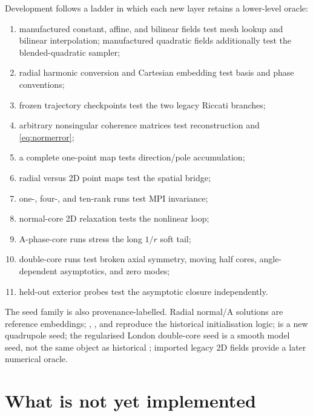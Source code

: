 \documentclass[11pt,a4paper]{article}
\newcommand{\code}[1]{\texttt{\detokenize{#1}}}
\begin{document}
Development follows a ladder in which each new layer retains a lower-level
oracle:
\begin{enumerate}
  \item manufactured constant, affine, and bilinear fields test mesh lookup
  and bilinear interpolation; manufactured quadratic fields additionally test
the blended-quadratic sampler;
  \item radial harmonic conversion and Cartesian embedding test basis and
  phase conventions;
  \item frozen trajectory checkpoints test the two legacy Riccati branches;
  \item arbitrary nonsingular coherence matrices test reconstruction and
  \eqref{eq:normerror};
  \item a complete one-point map tests direction/pole accumulation;
  \item radial versus 2D point maps test the spatial bridge;
  \item one-, four-, and ten-rank runs test MPI invariance;
  \item normal-core 2D relaxation tests the nonlinear loop;
  \item A-phase-core runs stress the long $1/r$ soft tail;
  \item double-core runs test broken axial symmetry, moving half cores,
  angle-dependent asymptotics, and zero modes;
  \item held-out exterior probes test the asymptotic closure independently.
\end{enumerate}

The seed family is also provenance-labelled.  Radial normal/A solutions are
reference embeddings; \code{nop}, \code{aop}, and \code{dop} reproduce the
historical initialisation logic; \code{qop} is a new quadrupole seed; the regularised London double-core seed is a
smooth model seed, not the same object as historical \code{dop}; imported
legacy 2D fields provide a later numerical oracle.

\section{What is not yet implemented}
\end{document}
